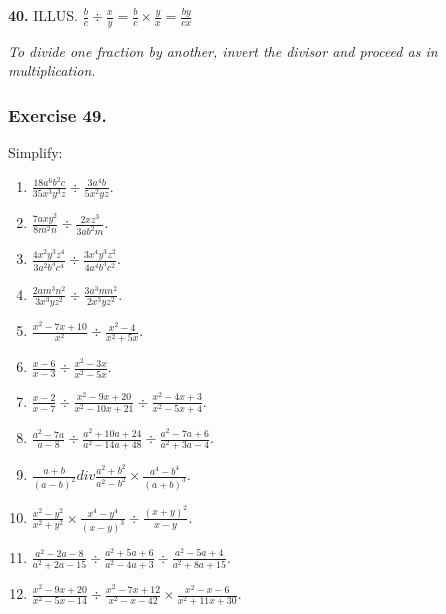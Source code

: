 \documentclass{book}
\begin{document}
\textbf{ 40.} ILLUS. $\displaystyle \frac{b}{c}\div
\frac{x}{y}=\frac{b}{c}\times\frac{y}{x}=\frac{by}{cx}$

\textit{ To divide one fraction by another, invert the divisor and
proceed as in multiplication}.

\subsubsection*{Exercise 49.}



Simplify:
\begin{enumerate}
\item $\displaystyle \frac{18a^6b^2c}{35x^3y^3z}\div
\frac{3a^4b}{5x^2yz}$.

\item $\displaystyle \frac{7axy^2}{8m^2n}\div
\frac{2xz^3}{3ab^2m}$.

\item $\displaystyle \frac{4x^2y^3z^4}{3a^2b^3c^4}\div
\frac{3x^4y^3z^2}{4a^4b^3c^2}$.

\item $\displaystyle \frac{2am^3n^2}{3x^3yz^2}\div
\frac{3a^3mn^2}{2x^3yz^2}$.

\item $\displaystyle \frac{x^2-7x+10}{x^2}\div
\frac{x^2-4}{x^2+5x}$.

\item $\displaystyle \frac{x-6}{x-3}\div \frac{x^2-3x}{x^2-5x}$.

\item $\displaystyle \frac{x-2}{x-7}\div
\frac{x^2-9x+20}{x^2-10x+21}\div \frac{x^2-4x+3}{x^2-5x+4}$.

\item $\displaystyle \frac{a^2-7a}{a-8}\div
\frac{a^2+10a+24}{a^2-14a+48}\div \frac{a^2-7a+6}{a^2+3a-4}$.

\item $\displaystyle \frac{a+b}{(a-b)^2}div
\frac{a^2+b^2}{a^2-b^2}\times\frac{a^4-b^4}{(a+b)^3}$.

\item $\displaystyle
\frac{x^2-y^2}{x^2+y^2}\times\frac{x^4-y^4}{(x-y)^3}\div
\frac{(x+y)^2}{x-y}$.

\item $\displaystyle \frac{a^2-2a-8}{a^2+2a-15}\div
\frac{a^2+5a+6}{a^2-4a+3}\div \frac{a^2-5a+4}{a^2+8a+15}$.

\item $\displaystyle \frac{x^2-9x+20}{x^2-5x-14}\div
\frac{x^2-7x+12}{x^2-x-42}\times\frac{x^2-x-6}{x^2+11x+30}$.


\end{enumerate}
\end{document}
